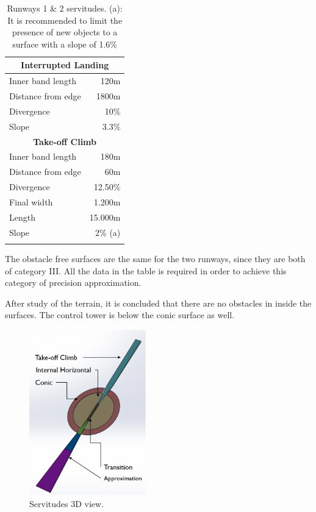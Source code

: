 \begin{longtable}[htb]{@{}lr@{}}
		\midrule[2pt]
		\multicolumn{2}{c}{\textbf{Interrupted Landing} }\\
		\midrule[0.5pt]
		Inner band length & 120m\\
		Distance from edge & 1800m\\
		Divergence & 10\%\\
		Slope & 3.3\%\\
		\midrule[2pt]
		\multicolumn{2}{c}{\textbf{Take-off Climb} }\\
		\midrule[0.5pt]
		Inner band length & 180m\\
		Distance from edge & 60m\\
		Divergence & 12.50\%\\
		Final width & 1.200m\\
		Length & 15.000m\\
		Slope & 2\% (a)\\
		\bottomrule[3pt]
		\caption{Runways 1 \& 2 servitudes. (a): It is recommended to limit the presence of new objects to a surface with a slope of 1.6\%}
	\end{longtable}
	
	The obstacle free surfaces are the same for the two runways, since they are both of category III. All the data in the table is required in order to achieve this category of precision approximation.
	
	After study of the terrain, it is concluded that there are no obstacles in inside the surfaces. The control tower is below the conic surface as well.
	
	
	\begin{figure}[H]
		\centering
		\includegraphics[clip, trim=0cm 0cm 0cm 0cm, width=0.45\textwidth]{./images/servidumbres/3Dservidumbres}
		\caption{Servitudes 3D view.}
		\label{3Dservidumbres}
	\end{figure}


